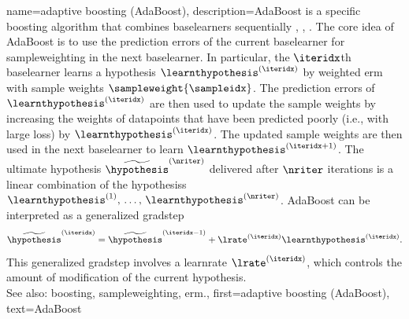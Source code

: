 {name={adaptive boosting (AdaBoost)},
	description={AdaBoost is a specific 
		\gls{boosting} \gls{algorithm} that combines \glspl{baselearner} sequentially 
		\cite{pmlr-vR2-ridgeway99a}, \cite{Schapire1999}, \cite{Drucker1997}. 
	    	The core idea of AdaBoost is to use the \gls{prediction} errors of the current  
		\gls{baselearner} for \gls{sampleweighting} in the next \gls{baselearner}. 
		In particular, the $\iteridx$th \gls{baselearner} learns a \gls{hypothesis} 
		$\learnthypothesis^{(\iteridx)}$ by weighted \gls{erm} with  
		\gls{sample} \glspl{weight} $\sampleweight{\sampleidx}$. The \gls{prediction} errors of 
		$\learnthypothesis^{(\iteridx)}$ are then used to update the 
		\gls{sample} \glspl{weight} by increasing the \glspl{weight} of \glspl{datapoint} 
		that have been predicted poorly (i.e., with large \gls{loss}) 
		by $\learnthypothesis^{(\iteridx)}$. The updated \gls{sample} \glspl{weight} are 
		then used in the next \gls{baselearner} to learn $\learnthypothesis^{(\iteridx+1)}$. 
		The ultimate \gls{hypothesis} $\widetilde{\hypothesis}^{(\nriter)}$ delivered after 
		$\nriter$ \glspl{iteration} is a linear combination of the \glspl{hypothesis} 
		$\learnthypothesis^{(1)},\,\ldots,\,\learnthypothesis^{(\nriter)}$. 
		AdaBoost can be interpreted as a generalized \gls{gradstep} \cite[Ch. 10.4]{hastie01statisticallearning}
		$$\widetilde{\hypothesis}^{(\iteridx)}=\widetilde{\hypothesis}^{(\iteridx-1)}+\lrate^{(\iteridx)} \learnthypothesis^{(\iteridx)}.$$   
		This generalized \gls{gradstep} involves a \gls{learnrate} $\lrate^{(\iteridx)}$, which 
		controls the amount of modification of the current \gls{hypothesis}. 
		\\
		See also: \gls{boosting}, \gls{sampleweighting}, \gls{erm}.}, 
	first={adaptive boosting (AdaBoost)}, 
	text={AdaBoost}
}

